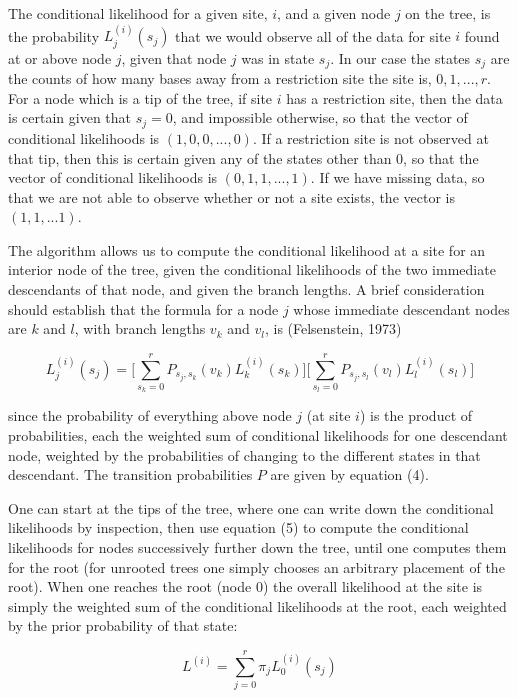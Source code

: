 The conditional likelihood for a given site, $i$, and a given node $j$ on the
tree, is the probability $L_j^{(i)}(s_j)$ that we would observe all of the
data for site $i$ found at or above node $j$, given that node $j$ was in state
$s_j$.   In our case the states $s_j$ are the counts of how many bases away
from a restriction site the site is, $0, 1, ..., r$.  For a node which is a tip
of the tree, if site $i$ has a restriction site, then the data is certain
given that $s_j = 0$, and impossible otherwise, so that the vector of
conditional likelihoods is  $(1, 0, 0, ..., 0)$.  If a restriction site is not
observed at that tip, then this is certain given any of the states other
than 0, so that the vector of conditional likelihoods is $(0, 1, 1, ..., 1)$.
If we have missing data, so that we are not able to observe whether or not a
site exists, the vector is $(1, 1, ... 1)$.

The algorithm allows us to compute the conditional likelihood at a site for
an interior node of the tree, given the conditional likelihoods of the two
immediate descendants of that node, and given the branch lengths.  
A brief consideration should establish that the formula for a node $j$ whose
immediate descendant nodes are $k$ and $l$, with branch lengths $v_k$ and $v_l$, is (Felsenstein, 1973)

\begin{equation} %
   L_j^{(i)}(s_j)  =   \biggl[ \sum_{s_k=0}^r P_{s_j,s_k}(v_k) L_k^{(i)}(s_k) \biggr] \biggl[
 \sum_{s_l=0}^r  P_{s_j,s_l}(v_l) L_l^{(i)}(s_l) \biggr]
\end{equation}

since the probability of everything above node $j$ (at site $i$) is the product
of probabilities, each the weighted sum of conditional likelihoods for one
descendant node, weighted by the probabilities of changing to the different
states in that descendant.  The transition probabilities $P$ are given by
equation (4).

One can start at the tips of the tree, where one can write down the
conditional likelihoods by inspection, then use equation (5) to compute the
conditional likelihoods for nodes successively further down the tree, until
one computes them for the root (for unrooted trees one simply chooses an
arbitrary placement of the root).  When one reaches the root (node 0) the
overall likelihood at the site is simply the weighted sum of the conditional
likelihoods at the root, each weighted by the prior probability of that state:

\begin{equation} %
      L^{(i)}   =   \sum_{j=0}^r \pi_{j} L_0^{(i)}(s_j)
\end{equation}

